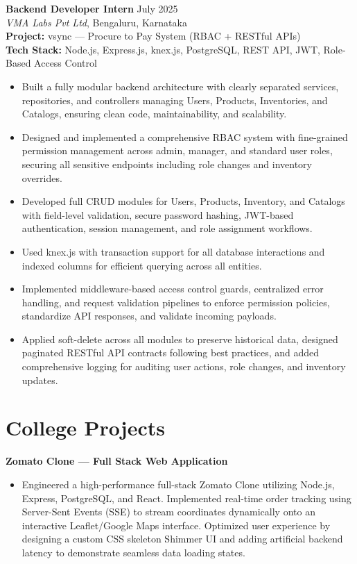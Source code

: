 \documentclass[10pt,letterpaper]{article}
\begin{document}
\vspace{6pt}
\noindent
\textbf{Backend Developer Intern} \hfill July 2025 \\
\textit{VMA Labs Pvt Ltd}, Bengaluru, Karnataka \\
\textbf{Project:} vsync --- Procure to Pay System (RBAC + RESTful APIs) \\
\textbf{Tech Stack:} Node.js, Express.js, knex.js, PostgreSQL, REST API, JWT, Role-Based Access Control
\begin{itemize}[leftmargin=0.2in, nosep, topsep=2pt]
    \item Built a fully modular backend architecture with clearly separated services, repositories, and controllers managing Users, Products, Inventories, and Catalogs, ensuring clean code, maintainability, and scalability.
    \item Designed and implemented a comprehensive RBAC system with fine-grained permission management across admin, manager, and standard user roles, securing all sensitive endpoints including role changes and inventory overrides.
    \item Developed full CRUD modules for Users, Products, Inventory, and Catalogs with field-level validation, secure password hashing, JWT-based authentication, session management, and role assignment workflows.
    \item Used knex.js with transaction support for all database interactions and indexed columns for efficient querying across all entities.
    \item Implemented middleware-based access control guards, centralized error handling, and request validation pipelines to enforce permission policies, standardize API responses, and validate incoming payloads.
    \item Applied soft-delete across all modules to preserve historical data, designed paginated RESTful API contracts following best practices, and added comprehensive logging for auditing user actions, role changes, and inventory updates.
\end{itemize}

\section{College Projects}
\noindent
\textbf{Zomato Clone --- Full Stack Web Application}
\begin{itemize}[leftmargin=0.2in, nosep, topsep=1pt]
    \item Engineered a high-performance full-stack Zomato Clone utilizing Node.js, Express, PostgreSQL, and React. Implemented real-time order tracking using Server-Sent Events (SSE) to stream coordinates dynamically onto an interactive Leaflet/Google Maps interface. Optimized user experience by designing a custom CSS skeleton Shimmer UI and adding artificial backend latency to demonstrate seamless data loading states.
\end{itemize}
\end{document}
